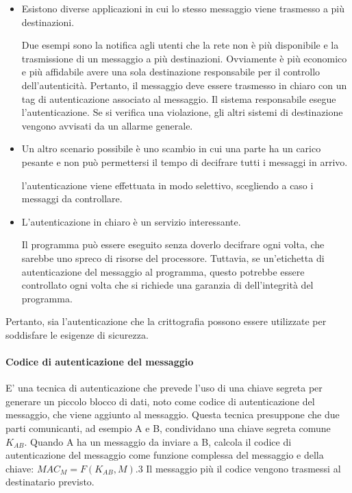 \begin{itemize}
    \item Esistono diverse applicazioni in cui lo stesso messaggio viene trasmesso a più destinazioni.
    
Due esempi sono la notifica agli utenti che la rete non è più disponibile e la trasmissione di un messaggio a più destinazioni. Ovviamente è più economico e più affidabile avere una sola destinazione responsabile per il controllo dell'autenticità. Pertanto, il messaggio deve essere trasmesso in chiaro con un tag di autenticazione associato al messaggio. Il sistema responsabile esegue l'autenticazione. Se si verifica una violazione, gli altri sistemi di destinazione vengono avvisati da un allarme generale.

    \item Un altro scenario possibile è uno scambio in cui una parte ha un carico pesante e non può permettersi il tempo di decifrare tutti i messaggi in arrivo.

l'autenticazione viene effettuata in modo selettivo, scegliendo a caso i messaggi da controllare.

    \item L'autenticazione in chiaro è un servizio interessante. 
    
Il programma può essere eseguito senza doverlo decifrare ogni volta, che sarebbe uno spreco di risorse del processore. Tuttavia, se un'etichetta di autenticazione del messaggio al programma, questo potrebbe essere controllato ogni volta che si richiede una garanzia di dell'integrità del programma.
\end{itemize}
Pertanto, sia l'autenticazione che la crittografia possono essere utilizzate per soddisfare le esigenze di sicurezza.

\singlespacing

\paragraph{Codice di autenticazione del messaggio} E' una tecnica di autenticazione che prevede l'uso di una chiave segreta per generare un piccolo blocco di dati, noto come codice di autenticazione del messaggio, che viene aggiunto al messaggio. Questa tecnica presuppone che due parti comunicanti, ad esempio A e B, condividano una chiave segreta comune $K_{AB}$. Quando A ha un messaggio da inviare a B, calcola il codice di autenticazione del messaggio come funzione complessa del messaggio e della chiave: $MAC_M = F(K_{AB}, M)$.3 Il messaggio più il codice vengono trasmessi al destinatario previsto. 

